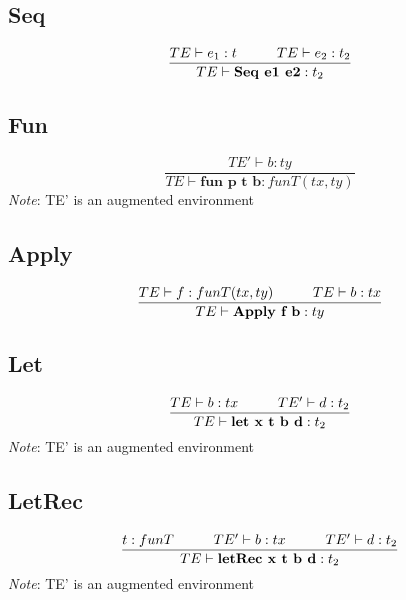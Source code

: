 \documentclass{article}
\newcommand\tab[1][1cm]{\hspace*{#1}}
\begin{document}
    \subsection{Seq}
        \begin{equation}
            \frac{TE \vdash e_1 : t \tab TE \vdash e_2 : t_2}{TE \vdash \textbf{Seq e1 e2} : t_2}
        \end{equation}
    \subsection{Fun}
        \begin{equation}
            \frac{TE' \vdash b : ty}{TE \vdash \textbf{fun p t b} : funT(tx, ty)}
        \end{equation}
        \textit{Note}: TE' is an augmented environment
    \subsection{Apply}
        \begin{equation}
            \frac{TE \vdash f : funT(tx, ty) \tab TE \vdash b : tx}{TE \vdash \textbf{Apply f b} : ty}
        \end{equation}
    \subsection{Let}
        \begin{equation}
            \frac{TE \vdash b : tx \tab TE' \vdash d : t_2}{TE \vdash \textbf{let x t b d} : t_2}
        \end{equation}
        \textit{Note}: TE' is an augmented environment
    \subsection{LetRec}
        \begin{equation}
            \frac{t : funT \tab TE' \vdash b : tx \tab TE' \vdash d : t_2}{TE \vdash \textbf{letRec x t b d} : t_2}
        \end{equation}
        \textit{Note}: TE' is an augmented environment
    
\end{document}
